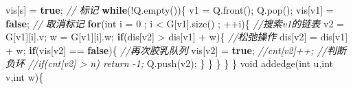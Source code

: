 \documentclass[
]{article}
\newenvironment{Shaded}{}{}
\newcommand{\CommentTok}[1]{\textcolor[rgb]{0.38,0.63,0.69}{\textit{#1}}}
\newcommand{\ControlFlowTok}[1]{\textcolor[rgb]{0.00,0.44,0.13}{\textbf{#1}}}
\newcommand{\DataTypeTok}[1]{\textcolor[rgb]{0.56,0.13,0.00}{#1}}
\newcommand{\DecValTok}[1]{\textcolor[rgb]{0.25,0.63,0.44}{#1}}
\newcommand{\KeywordTok}[1]{\textcolor[rgb]{0.00,0.44,0.13}{\textbf{#1}}}
\newcommand{\NormalTok}[1]{#1}
\newcommand{\OperatorTok}[1]{\textcolor[rgb]{0.40,0.40,0.40}{#1}}
\begin{document}
\begin{Shaded}
\begin{Highlighting}[]
\NormalTok{    vis}\OperatorTok{[}\NormalTok{s}\OperatorTok{]} \OperatorTok{=} \KeywordTok{true}\OperatorTok{;} \CommentTok{// 标记}
    \ControlFlowTok{while}\OperatorTok{(!}\NormalTok{Q}\OperatorTok{.}\NormalTok{empty}\OperatorTok{())\{}  
\NormalTok{        v1 }\OperatorTok{=}\NormalTok{ Q}\OperatorTok{.}\NormalTok{front}\OperatorTok{();}  
\NormalTok{        Q}\OperatorTok{.}\NormalTok{pop}\OperatorTok{();}  
\NormalTok{        vis}\OperatorTok{[}\NormalTok{v1}\OperatorTok{]} \OperatorTok{=} \KeywordTok{false}\OperatorTok{;} \CommentTok{// 取消标记}
         \ControlFlowTok{for}\OperatorTok{(}\DataTypeTok{int}\NormalTok{ i }\OperatorTok{=} \DecValTok{0} \OperatorTok{;}\NormalTok{ i }\OperatorTok{\textless{}}\NormalTok{ G}\OperatorTok{[}\NormalTok{v1}\OperatorTok{].}\NormalTok{size}\OperatorTok{()} \OperatorTok{;} \OperatorTok{++}\NormalTok{i}\OperatorTok{)\{}  \CommentTok{//搜索v1的链表}
\NormalTok{                v2 }\OperatorTok{=}\NormalTok{ G}\OperatorTok{[}\NormalTok{v1}\OperatorTok{][}\NormalTok{i}\OperatorTok{].}\NormalTok{v}\OperatorTok{;}
\NormalTok{                w }\OperatorTok{=}\NormalTok{ G}\OperatorTok{[}\NormalTok{v1}\OperatorTok{][}\NormalTok{i}\OperatorTok{].}\NormalTok{w}\OperatorTok{;}  
                \ControlFlowTok{if}\OperatorTok{(}\NormalTok{dis}\OperatorTok{[}\NormalTok{v2}\OperatorTok{]} \OperatorTok{\textgreater{}}\NormalTok{ dis}\OperatorTok{[}\NormalTok{v1}\OperatorTok{]} \OperatorTok{+}\NormalTok{ w}\OperatorTok{)\{} \CommentTok{//松弛操作}
\NormalTok{                    dis}\OperatorTok{[}\NormalTok{v2}\OperatorTok{]} \OperatorTok{=}\NormalTok{ dis}\OperatorTok{[}\NormalTok{v1}\OperatorTok{]} \OperatorTok{+}\NormalTok{ w}\OperatorTok{;} 
                    \ControlFlowTok{if}\OperatorTok{(}\NormalTok{vis}\OperatorTok{[}\NormalTok{v2}\OperatorTok{]} \OperatorTok{==} \KeywordTok{false}\OperatorTok{)\{} \CommentTok{//再次胶乳队列}
\NormalTok{                        vis}\OperatorTok{[}\NormalTok{v2}\OperatorTok{]} \OperatorTok{=} \KeywordTok{true}\OperatorTok{;}  
                        \CommentTok{//cnt[v2]++;   //判断负环}
                        \CommentTok{//if(cnt[v2] \textgreater{} n) return {-}1;  }
\NormalTok{                        Q}\OperatorTok{.}\NormalTok{push}\OperatorTok{(}\NormalTok{v2}\OperatorTok{);}  
                    \OperatorTok{\}} 
                \OperatorTok{\}} 
            \OperatorTok{\}}  
    \OperatorTok{\}}  
\OperatorTok{\}}
\DataTypeTok{void}\NormalTok{ addedge}\OperatorTok{(}\DataTypeTok{int}\NormalTok{ u}\OperatorTok{,}\DataTypeTok{int}\NormalTok{ v}\OperatorTok{,}\DataTypeTok{int}\NormalTok{ w}\OperatorTok{)\{}

\end{Highlighting}
\end{Shaded}
\end{document}
